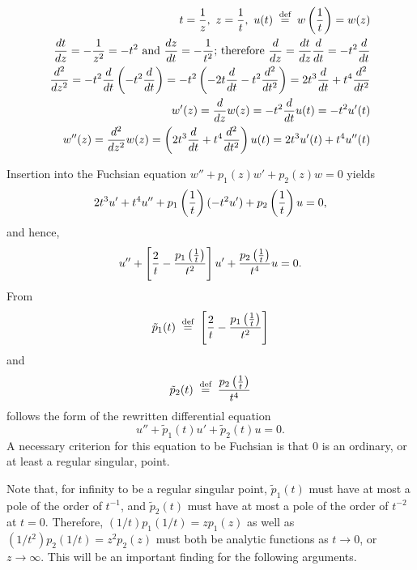 \begin{equation}
\begin{split}
t={1\over z},\ z={1\over t},\ u(t)\stackrel{{\tiny \textrm{ def }}}
=
w\left({1\over t}\right)=w(z)
\\
{dt\over dz}=-{1\over z^2}=-t^2\text{ and }
{dz\over dt}=-{1\over t^2}
\textrm{; therefore }
{d\over dz}
=   {dt\over dz} {d\over dt} =
-t^2{d\over dt}
\\
{d^2\over dz^2}=-t^2{d\over dt}\left(-t^2{d\over dt}\right)=
-t^2\left(-2t{d\over dt}-t^2{d^2\over dt^2}\right)=
2t^3{d\over dt}+t^4{d^2\over dt^2}
\\
w'(z)={d\over dz}w(z)=-t^2{d\over dt}u(t)=
-t^2u'(t)
\\
w''(z)={d^2\over dz^2}w(z)=
\left(2t^3{d\over dt}+t^4
{d^2\over dt^2}\right)u(t)=2t^3u'(t)+t^4u''(t)
\end{split}
\end{equation}

Insertion into the Fuchsian equation $w''+p_1(z)w'+p_2(z)w=0 $ yields
\begin{equation}
   2t^3u'+t^4u''+p_1\left({1\over t}\right)(-t^2u')+
   p_2\left({1\over t}\right)u=0,
\end{equation}
and hence,
\begin{equation}
    u''+\left[{2\over t}-{p_1\left({1\over t}\right)
   \over t^2}\right]u'+{p_2\left({1\over t}\right)\over t^4}u=0.
\end{equation}
From
\begin{equation}
\tilde p_1(t)\stackrel{{\tiny \textrm{ def }}}{=} \left[{2\over t}-
{p_1\left({1\over t}\right)\over t^2}\right]
\label{2016-m-ch-sf-idp1}
\end{equation}
and
\begin{equation}
\displaystyle \tilde p_2(t)\stackrel{{\tiny \textrm{ def }}}{=} {p_2\left({1\over t}\right)\over t^4}
\label{2016-m-ch-sf-idp2}
\end{equation}
follows the form of the rewritten differential equation
\begin{equation}
u''+\tilde p_1(t)u'+\tilde p_2(t)u=0.
\end{equation}
A necessary criterion for this equation to be Fuchsian is that $0$ is an ordinary,
or at least a regular singular, point.

Note that, for infinity to be a regular singular point,
$\tilde p_1(t)$ must have at most a pole of the order of $ t^{-1}$,
and
$\tilde p_2(t)$ must have at most a pole of the order of $t^{-2}$
at $t=0$.
Therefore,
$(1/t) p_1(1/t) = z p_1(z)$
as well as
$(1/t^2) p_2(1/t) = z^2 p_2(z)$
must both be analytic functions as $t\rightarrow 0$,
or $z\rightarrow \infty$.
This will be an important finding for the following arguments.


